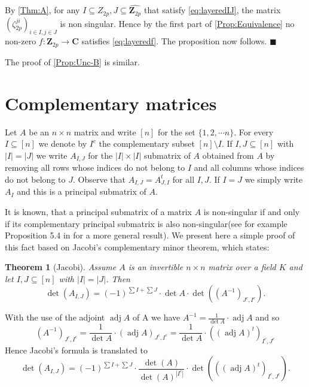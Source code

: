 \documentclass[10pt,a4paper]{amsart}
\newtheorem{theorem}{Theorem}
\DeclareMathOperator{\adj}{adj}
\newenvironment{proofofPropA}{{\bf {Proof of \autoref{Prop:Unc-A}.} }}{\hfill $\blacksquare$ \\}
\def\Z{\mathbf{Z}}
\def\C{\mathbf{C}}
\begin{document}
\begin{proofofPropA}
    By  \autoref{Thm:A}, for any $I \subseteq Z_{2p},  J \subseteq \widehat{\Z_{2p}}$ that satisfy \eqref{eq:layeredIJ}, the  matrix $(\zeta_{2p}^{ji})_{i \in I, j\in J}$  is non singular. Hence by the  first part of \autoref{Prop:Equivalence} no non-zero $f:\Z_{2p} \to \C$ satisfies \eqref{eq:layeredf}. The proposition now follows.
\end{proofofPropA}

The proof of \autoref{Prop:Unc-B} is similar.

\section{Complementary matrices} 
\label{Complementary}


Let $A$ be an $n \times n $ matrix and write $[n]$ for the set $\{ 1, 2, \cdots n \}$.  For every $I \subseteq [n]$ we denote by $I^c$ the complementary subset $[n] \setminus I $. If $I, J \subseteq [n]$ with $|I|=|J|$  we write  $A_{I, J}$ for the $|I| \times |I|$ submatrix of $A$ obtained from $A$ by removing all rows whose indices do not belong to $I$ and all columns  whose indices do not belong to $J$. Observe that
$A_{I,J} = A^t_{J,I}$  for all $I, J$.  If $I = J$ we simply write $A_I$ and this is a principal submatrix of $A$.

 It is known,  that a principal submatrix  of a matrix $A$  is non-singular  if and only if its complementary principal submatrix  is also non-singular(see for example Proposition 5.4 in \cite{Brow} for a more general result). We present here a simple proof of this fact based on 
Jacobi's complementary minor theorem, which states:
\begin{theorem}[Jacobi]
   Assume $A $ is an invertible $ n \times n$ matrix over a field $K$ and let $I, J \subseteq [n]$ with $|I|=|J|$. Then 
   \[
   \det (A_{I,J}) = (-1)^{\sum I +\sum J} \cdot \det A \cdot \det( (A^{-1})_{J^c, I^c}).
   \]
\end{theorem}
With the use of the adjoint $\adj A$ of A we have  $A^{-1} = \frac{1}{\det A} \cdot \adj A$ and  so  
\[
(A^{-1})_{J^c, I^c}=  \frac{1}{\det A} \cdot (\adj A)_{J^c, I^c}= \frac{1}{\det A} \cdot ((\adj A)^t)_{I^c, J^c}
\]
Hence Jacobi's formula is translated to 
\begin{equation}\label{eq:jacobi-adj}
   \det (A_{I,J})= (-1)^{\sum I +\sum J} \cdot \frac{\det(A)}{\det(A)^{|I^c|}} \cdot \det(((\adj A)^t)_{I^c, J^c}).
\end{equation}
\end{document}
